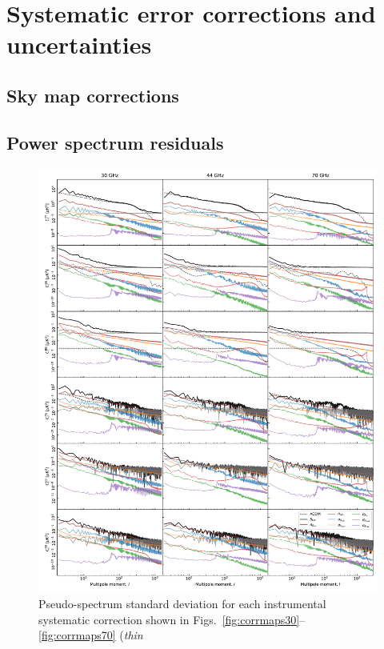 \documentclass[twocolumn]{../../common/aa}
\begin{document}
\section{Systematic error corrections and uncertainties}
\label{sec:systematics}

\subsection{Sky map corrections}



\subsection{Power spectrum residuals}

\begin{figure}
  \center	
  \includegraphics[width=0.98\linewidth]{figures/components_power_spectrum_std_masked.pdf}
  \caption{Pseudo-spectrum standard deviation for each instrumental
    systematic correction shown in
    Figs.~\ref{fig:corrmaps30}--\ref{fig:corrmaps70} (\emph{thin
}}
\end{figure}
\end{document}
